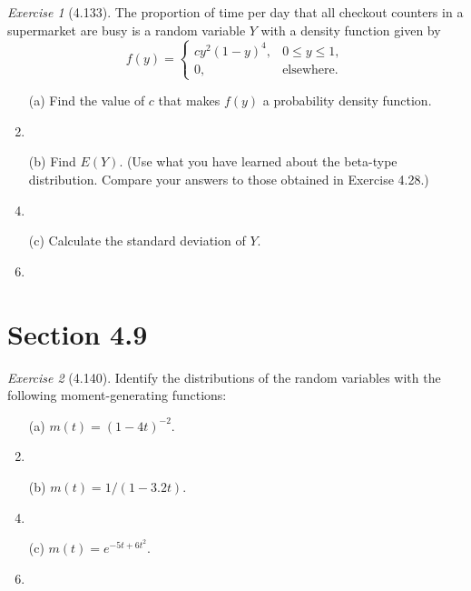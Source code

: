 \documentclass[12pt]{amsart}
\makeatletter
\theoremstyle{remark}
\newtheorem*{exercise}{Exercise}%
\renewenvironment{proof}[1][\proofname]{\par\doublespacing
  \pushQED{\qed}%
  \normalfont \topsep6\p@\@plus6\p@\relax
  \list{}{%
    \settowidth{\leftmargin}{\itshape\proofname:\hskip\labelsep}%
    \setlength{\labelwidth}{0pt}%
    \setlength{\itemindent}{-\leftmargin}%
  }%
  \item[\hskip\labelsep\itshape#1\@addpunct{:}]\ignorespaces
}{%
  \popQED\endlist\@endpefalse
  \singlespacing
}
\theoremstyle{mycomment}
\makeatother
\begin{document}
\begin{exercise}[4.133]
The proportion of time per day that all checkout counters in a supermarket are busy is a random variable $Y$ with a density function given by
$$f(y) = \begin{cases}
cy^2(1 - y)^4, & 0 \leq y \leq 1, \\
0, & \text{elsewhere}.
\end{cases}$$

\begin{enumerate}
    \item[(a)] Find the value of $c$ that makes $f(y)$ a probability density function.
\begin{proof}[Solution]
 
\end{proof}
    \item[(b)] Find $E(Y)$. (Use what you have learned about the beta-type distribution. Compare your answers to those obtained in Exercise 4.28.)
\begin{proof}[Solution]
 
\end{proof}
    \item[(c)] Calculate the standard deviation of $Y$.
\begin{proof}[Solution]
 
\end{proof}
\end{enumerate}
\end{exercise}

\section*{Section 4.9}

\begin{exercise}[4.140]
Identify the distributions of the random variables with the following moment-generating functions:

\begin{enumerate}
    \item[(a)] $m(t) = (1 - 4t)^{-2}$.
\begin{proof}[Solution]
 
\end{proof}
    \item[(b)] $m(t) = 1/(1 - 3.2t)$.
\begin{proof}[Solution]
 
\end{proof}
    \item[(c)] $m(t) = e^{-5t+6t^2}$.
\begin{proof}[Solution]
 
\end{proof}
\end{enumerate}
\end{exercise}
\end{document}
